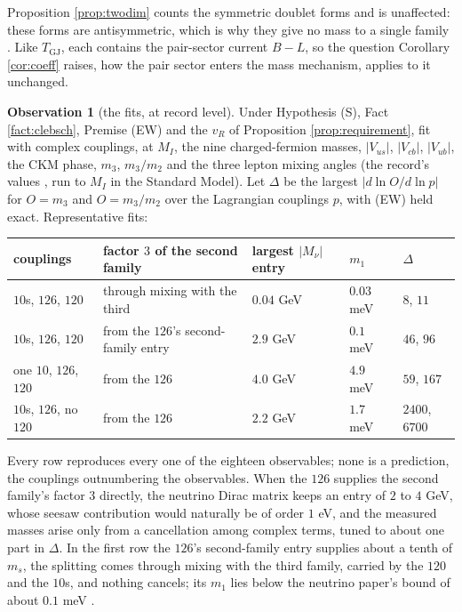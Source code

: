 \documentclass[11pt]{article}
\theoremstyle{definition}
\newtheorem{observation}[theorem]{Observation}
\begin{document}
Proposition \ref{prop:twodim} counts the symmetric doublet forms and is unaffected: these forms are antisymmetric, which is why they give no mass to a single family \cite[Prop.~8.1(iii)]{ButlerT13}. Like $T_{\mathrm{GJ}}$, each contains the pair-sector current $B - L$, so the question Corollary \ref{cor:coeff} raises, how the pair sector enters the mass mechanism, applies to it unchanged.

\begin{observation}[the fits, at record level]\label{obs:anglefits}
Under Hypothesis (S), Fact \ref{fact:clebsch}, Premise (EW) and the $v_{R}$ of Proposition \ref{prop:requirement}, fit with complex couplings, at $M_{I}$, the nine charged-fermion masses, $|V_{us}|$, $|V_{cb}|$, $|V_{ub}|$, the CKM phase, $m_{3}$, $m_{3}/m_{2}$ and the three lepton mixing angles (the record's values \cite{PDG2024}, run to $M_{I}$ in the Standard Model). Let $\Delta$ be the largest $|d\ln O/d\ln p|$ for $O = m_{3}$ and $O = m_{3}/m_{2}$ over the Lagrangian couplings $p$, with (EW) held exact. Representative fits:
\begin{center}\small
\begin{tabular}{@{}lllll@{}}
\toprule
couplings & factor $3$ of the second family & largest $|M_{\nu}|$ entry & $m_{1}$ & $\Delta$ \\
\midrule
$10$s, $126$, $120$ & through mixing with the third & $0.04$ GeV & $0.03$ meV & $8$, $11$ \\
$10$s, $126$, $120$ & from the $126$'s second-family entry & $2.9$ GeV & $0.1$ meV & $46$, $96$ \\
one $10$, $126$, $120$ & from the $126$ & $4.0$ GeV & $4.9$ meV & $59$, $167$ \\
$10$s, $126$, no $120$ & from the $126$ & $2.2$ GeV & $1.7$ meV & $2400$, $6700$ \\
\bottomrule
\end{tabular}
\end{center}
Every row reproduces every one of the eighteen observables; none is a prediction, the couplings outnumbering the observables. When the $126$ supplies the second family's factor $3$ directly, the neutrino Dirac matrix keeps an entry of $2$ to $4$ GeV, whose seesaw contribution would naturally be of order $1$ eV, and the measured masses arise only from a cancellation among complex terms, tuned to about one part in $\Delta$. In the first row the $126$'s second-family entry supplies about a tenth of $m_{s}$, the splitting comes through mixing with the third family, carried by the $120$ and the $10$s, and nothing cancels; its $m_{1}$ lies below the neutrino paper's bound of about $0.1$ meV \cite{ButlerT15}.
\end{observation}
\end{document}
